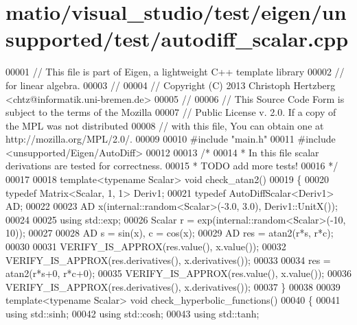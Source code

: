 \hypertarget{matio_2visual__studio_2test_2eigen_2unsupported_2test_2autodiff__scalar_8cpp_source}{}\section{matio/visual\+\_\+studio/test/eigen/unsupported/test/autodiff\+\_\+scalar.cpp}
\label{matio_2visual__studio_2test_2eigen_2unsupported_2test_2autodiff__scalar_8cpp_source}

\begin{DoxyCode}
00001 \textcolor{comment}{// This file is part of Eigen, a lightweight C++ template library}
00002 \textcolor{comment}{// for linear algebra.}
00003 \textcolor{comment}{//}
00004 \textcolor{comment}{// Copyright (C) 2013 Christoph Hertzberg <chtz@informatik.uni-bremen.de>}
00005 \textcolor{comment}{//}
00006 \textcolor{comment}{// This Source Code Form is subject to the terms of the Mozilla}
00007 \textcolor{comment}{// Public License v. 2.0. If a copy of the MPL was not distributed}
00008 \textcolor{comment}{// with this file, You can obtain one at http://mozilla.org/MPL/2.0/.}
00009 
00010 \textcolor{preprocessor}{#include "main.h"}
00011 \textcolor{preprocessor}{#include <unsupported/Eigen/AutoDiff>}
00012 
00013 \textcolor{comment}{/*}
00014 \textcolor{comment}{ * In this file scalar derivations are tested for correctness.}
00015 \textcolor{comment}{ * TODO add more tests!}
00016 \textcolor{comment}{ */}
00017 
00018 \textcolor{keyword}{template}<\textcolor{keyword}{typename} Scalar> \textcolor{keywordtype}{void} check\_atan2()
00019 \{
00020   \textcolor{keyword}{typedef} Matrix<Scalar, 1, 1> Deriv1;
00021   \textcolor{keyword}{typedef} AutoDiffScalar<Deriv1> AD;
00022   
00023   AD x(internal::random<Scalar>(-3.0, 3.0), Deriv1::UnitX());
00024   
00025   \textcolor{keyword}{using} std::exp;
00026   Scalar r = exp(internal::random<Scalar>(-10, 10));
00027   
00028   AD s = sin(x), c = cos(x);
00029   AD res = atan2(r*s, r*c);
00030   
00031   VERIFY\_IS\_APPROX(res.value(), x.value());
00032   VERIFY\_IS\_APPROX(res.derivatives(), x.derivatives());
00033 
00034   res = atan2(r*s+0, r*c+0);
00035   VERIFY\_IS\_APPROX(res.value(), x.value());
00036   VERIFY\_IS\_APPROX(res.derivatives(), x.derivatives());
00037 \}
00038 
00039 \textcolor{keyword}{template}<\textcolor{keyword}{typename} Scalar> \textcolor{keywordtype}{void} check\_hyperbolic\_functions()
00040 \{
00041   \textcolor{keyword}{using} std::sinh;
00042   \textcolor{keyword}{using} std::cosh;
00043   \textcolor{keyword}{using} std::tanh;

\end{DoxyCode}
